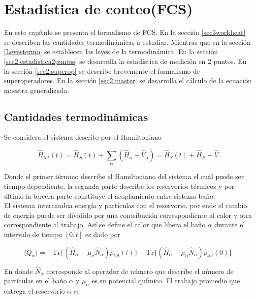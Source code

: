 \label{sec:lindblad}


\chapter{Estadística de conteo(FCS)}
En este capítulo se presenta el formalismo de FCS. En la sección \ref{sec3workheat} se describen las cantidades termodinámicas a estudiar. Mientras que en la sección \ref{Leyestermo} se establecen las leyes de la termodinámica. En la sección \ref{sec2:estadistica2puntos} se desarrolla la estadística de medición en 2 puntos. En la sección \ref{sec2:superop} se describe brevemente el formalismo de superoperadores. En la sección \ref{sec2:master} se desarrolla el cálculo de la ecuación maestra generalizada. 

\section{Cantidades termodinámicas}
Se considera el sistema descrito por el Hamiltoniano

\begin{equation*}
    \hat{H}_{tot}(t) = \hat{H}_{S}(t) + \sum_{\alpha}(\hat{H}_{\alpha} + \hat{V}_{\alpha})  = \hat{H}_{S}(t) + \hat{H}_{B} + \hat{V}
\end{equation*}

Donde el primer término describe el Hamiltoniano del sistema el cuál puede ser tiempo dependiente, la segunda parte describe los reservorios térmicos y por último la tercera parte constituye el acoplamiento entre sistema-baño.\\
El sistema intercambia energía y partículas con el reservorio, por ende el cambio de energía puede ser dividido por una contribución correspondiente al calor y otra correspondiente al trabajo. Así se define el calor que libera el baño $\alpha$ durante el intervalo de tiempo $[0,t]$ es dado por

\begin{equation*}
    \langle Q_{\alpha}\rangle = - \text{Tr}\{(\hat{H}_{\alpha} - \mu_{\alpha}\hat{N}_{\alpha})\hat{\rho}_{tot}(t) \} + \text{Tr}\{(\hat{H}_{\alpha} - \mu_{\alpha}\hat{N}_{\alpha})\hat{\rho}_{tot}(0) \}
\end{equation*}

En donde $\hat{N}_{\alpha}$ corresponde al operador de número que describe el número de partículas en el baño $\alpha$ y $\mu_{\alpha}$ es su potencial químico. El trabajo promedio que entrega el reservorio $\alpha$ es

